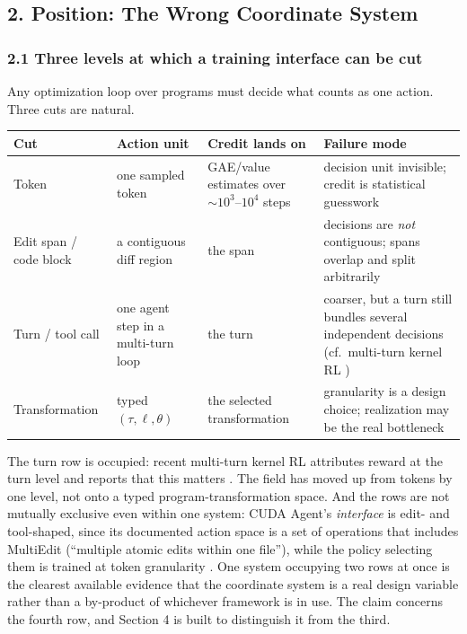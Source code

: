\documentclass[
  11pt,
]{article}
\begin{document}
\hypertarget{position-the-wrong-coordinate-system}{%
\subsection{2. Position: The Wrong Coordinate System}\label{position-the-wrong-coordinate-system}}

\hypertarget{three-levels-at-which-a-training-interface-can-be-cut}{%
\subsubsection{2.1 Three levels at which a training interface can be cut}\label{three-levels-at-which-a-training-interface-can-be-cut}}

Any optimization loop over programs must decide what counts as one action. Three cuts are natural.

\begin{longtable}[]{@{}
  >{\raggedright\arraybackslash}p{}
  >{\raggedright\arraybackslash}p{}
  >{\raggedright\arraybackslash}p{}
  >{\raggedright\arraybackslash}p{}@{}}
\toprule
Cut & Action unit & Credit lands on & Failure mode \\
\midrule
\endhead
Token & one sampled token & GAE/value estimates over \(\sim 10^{3}\)--\(10^{4}\) steps & decision unit invisible; credit is statistical guesswork \\
Edit span / code block & a contiguous diff region & the span & decisions are \emph{not} contiguous; spans overlap and split arbitrarily \\
Turn / tool call & one agent step in a multi-turn loop & the turn & coarser, but a turn still bundles several independent decisions (cf.~multi-turn kernel RL \cite{kevin32}) \\
Transformation & typed \((\tau, \ell, \theta)\) & the selected transformation & granularity is a design choice; realization may be the real bottleneck \\
\bottomrule
\end{longtable}

The turn row is occupied: recent multi-turn kernel RL attributes reward at the turn level and reports that this matters \cite{kevin32}. The field has moved up from tokens by one level, not onto a typed program-transformation space. And the rows are not mutually exclusive even within one system: CUDA Agent's \emph{interface} is edit- and tool-shaped, since its documented action space is a set of operations that includes MultiEdit (``multiple atomic edits within one file''), while the policy selecting them is trained at token granularity \cite{cuda1}. One system occupying two rows at once is the clearest available evidence that the coordinate system is a real design variable rather than a by-product of whichever framework is in use. The claim concerns the fourth row, and Section 4 is built to distinguish it from the third.
\end{document}
